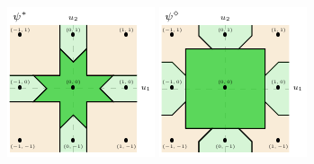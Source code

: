 \documentclass[11pt]{article}
\begin{document}
\begin{figure}
	\begin{center}
		\begin{minipage}{0.32\linewidth}
			\includegraphics[width=\linewidth]{tikz/lovasz-link-psi-star.pdf}
		\end{minipage}\hfill
		\begin{minipage}{0.32\linewidth}
			\includegraphics[width=\linewidth]{tikz/lovasz-link-psi-diamond.pdf}

\end{minipage}
\end{center}
\end{figure}
\end{document}
